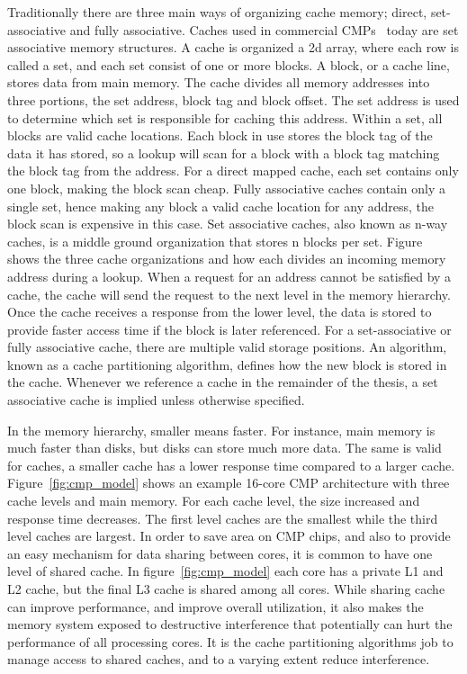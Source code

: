 Traditionally there are three main ways of organizing cache memory; direct, set-associative and fully associative.
Caches used in commercial CMPs~\cite{Thomadakis2011, Jain2013} today are set associative memory structures.
A cache is organized a 2d array, where each row is called a set, and each set consist of one or more blocks.
A block, or a cache line, stores data from main memory.
The cache divides all memory addresses into three portions, the set address, block tag and block offset.
The set address is used to determine which set is responsible for caching this address.
Within a set, all blocks are valid cache locations.
Each block in use stores the block tag of the data it has stored, so a lookup will scan for a block with a block tag matching the block tag from the address.
For a direct mapped cache, each set contains only one block, making the block scan cheap.
Fully associative caches contain only a single set, hence making any block a valid cache location for any address, the block scan is expensive in this case.
Set associative caches, also known as n-way caches, is a middle ground organization that stores n blocks per set.
Figure~ shows the three cache organizations and how each divides an incoming memory address during a lookup.
When a request for an address cannot be satisfied by a cache, the cache will send the request to the next level in the memory hierarchy.
Once the cache receives a response from the lower level, the data is stored to provide faster access time if the block is later referenced.
For a set-associative or fully associative cache, there are multiple valid storage positions.
An algorithm, known as a cache partitioning algorithm, defines how the new block is stored in the cache.
Whenever we reference a cache in the remainder of the thesis, a set associative cache is implied unless otherwise specified.

In the memory hierarchy, smaller means faster. 
For instance, main memory is much faster than disks, but disks can store much more data.
The same is valid for caches, a smaller cache has a lower response time compared to a larger cache.
Figure~\ref{fig:cmp_model} shows an example 16-core CMP architecture with three cache levels and main memory.
For each cache level, the size increased and response time decreases.
The first level caches are the smallest while the third level caches are largest.
In order to save area on CMP chips, and also to provide an easy mechanism for data sharing between cores, it is common to have one level of shared cache.
In figure~\ref{fig:cmp_model} each core has a private L1 and L2 cache, but the final L3 cache is shared among all cores.
While sharing cache can improve performance, and improve overall utilization, it also makes the memory system exposed to destructive interference that potentially can hurt the performance of all processing cores. 
It is the cache partitioning algorithms job to manage access to shared caches, and to a varying extent reduce interference.


